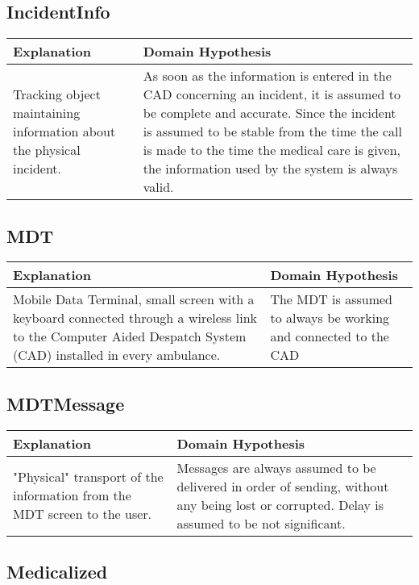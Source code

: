 \subsection{IncidentInfo}

\begin{tabularx}{\textwidth}{|X|X|} \hline
Explanation & Domain Hypothesis\\ \hline
Tracking object maintaining information about the physical incident.
& As soon as the information is entered in the CAD concerning an incident, it is assumed to be complete and accurate.  Since the incident is assumed to be stable from the time the call is made to the time the medical care is given, the information used by the system is always valid. \\ \hline
\end{tabularx}


\subsection{\og MDT \fg}

\begin{tabularx}{\textwidth}{|X|X|} \hline
Explanation & Domain Hypothesis\\ \hline
Mobile Data Terminal, small screen with a keyboard connected through a wireless link to the Computer Aided Despatch System (CAD) installed in every ambulance.
& The MDT is assumed to always be working and connected to the CAD \\ \hline
\end{tabularx}


\subsection{MDTMessage}

\begin{tabularx}{\textwidth}{|X|X|} \hline
Explanation & Domain Hypothesis\\ \hline
"Physical" transport of the information from the MDT screen to the user.
& Messages are always assumed to be delivered in order of sending, without any being lost or corrupted. Delay is assumed to be not significant. \\ \hline
\end{tabularx}


\subsection{Medicalized}


